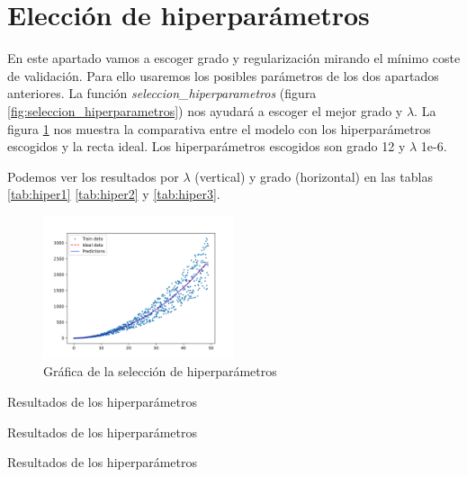 \documentclass[6pt]{../../shared/AiTex}
\begin{document}
\section{Elección de hiperparámetros}

En este apartado vamos a escoger grado y regularización mirando el mínimo coste de validación. Para ello usaremos los posibles parámetros de los dos apartados anteriores. La función \textit{seleccion\_hiperparametros} (figura \ref{fig:seleccion_hiperparametros}) nos ayudará a escoger el mejor grado y $\lambda$. La figura \ref{fig:seleccion_hiperparametros_plot} nos muestra la comparativa entre el modelo con los hiperparámetros escogidos y la recta ideal. Los hiperparámetros escogidos son grado 12 y $\lambda$ 1e-6.

Podemos ver los resultados por $\lambda$ (vertical) y grado (horizontal) en las tablas \ref{tab:hiper1} \ref{tab:hiper2} y \ref{tab:hiper3}.

\begin{figure}[H]
    \centering
    \includegraphics[width=0.5\textwidth]{./images/hiperparametros.png}
    \caption{Gráfica de la selección de hiperparámetros}
    \label{fig:seleccion_hiperparametros_plot}
\end{figure}

\begin{table}[H]
    \centering
    \caption{Resultados de los hiperparámetros}
    \label{tab:hiper1}
\end{table}

\begin{table}[H]
    \centering
    \caption{Resultados de los hiperparámetros}
    \label{tab:hiper2}
\end{table}

\begin{table}[H]
    \centering
    \caption{Resultados de los hiperparámetros}
    \label{tab:hiper3}
\end{table}
\end{document}

